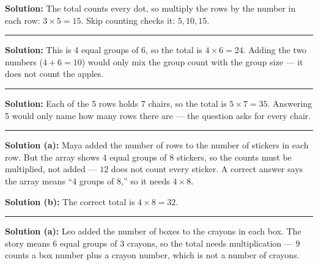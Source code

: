 \documentclass[12pt]{article}
\begin{document}



\textbf{Solution:} The total counts every dot, so multiply the rows by the number in each row: $3 \times 5 = 15$. Skip counting checks it: $5, 10, 15$. 

\vspace{0.2cm}\noindent\rule{\linewidth}{0.2pt}


\textbf{Solution:} This is 4 equal groups of 6, so the total is $4 \times 6 = 24$. Adding the two numbers ($4 + 6 = 10$) would only mix the group count with the group size --- it does not count the apples. 

\vspace{0.2cm}\noindent\rule{\linewidth}{0.2pt}


\textbf{Solution:} Each of the 5 rows holds 7 chairs, so the total is $5 \times 7 = 35$. Answering 5 would only name how many rows there are --- the question asks for every chair. 

\vspace{0.2cm}\noindent\rule{\linewidth}{0.2pt}


\textbf{Solution (a):} Maya added the number of rows to the number of stickers in each row. But the array shows 4 equal groups of 8 stickers, so the counts must be multiplied, not added --- $12$ does not count every sticker. A correct answer says the array means ``4 groups of 8,'' so it needs $4 \times 8$.

\textbf{Solution (b):} The correct total is $4 \times 8 = 32$. 

\vspace{0.2cm}\noindent\rule{\linewidth}{0.2pt}


\textbf{Solution (a):} Leo added the number of boxes to the crayons in each box. The story means 6 equal groups of 3 crayons, so the total needs multiplication --- $9$ counts a box number plus a crayon number, which is not a number of crayons.
\end{document}
